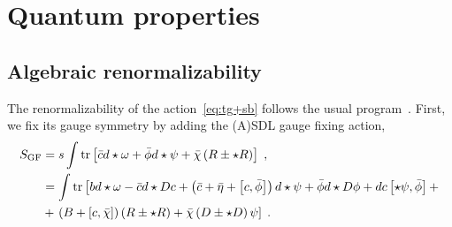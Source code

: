 \documentclass[../main.tex]{subfiles}
\begin{document}
\section{Quantum properties}\label{sec:quantum}

\subsection{Algebraic renormalizability}\label{ssec:renorm;sec:quantum}

The renormalizability of the action~\eqref{eq:tg+sb} follows the usual program~\cite{brandhuber1994a,sadovski2017c}. First, we fix its gauge symmetry by adding the (A)SDL gauge fixing action,
\begin{subequations}%
  \label{eq:tg-gf-action}
  \begin{align}
    S_{\text{GF}} & = s \int \operatorname{tr} \left[ \bar{c} d \star \omega + \bar{\phi} d \star \psi + \bar{\chi} \left( R \pm \star R \right) \right] \;,                                                                                                           \\
                  & = \int \operatorname{tr} \left[ b d \star \omega - \bar{c} d \star Dc + \left( \bar{c} + \bar{\eta} + \left[ c,\bar{\phi} \right] \right) d \star \psi + \bar{\phi} d \star D \phi + d c \left[ \star \psi ,\bar{\phi} \right] + \right. \nonumber \\
                  & + \left. \left( B + \left[ c,\bar{\chi} \right] \right) \left( R \pm \star R \right) + \bar{\chi} \left( D \pm \star D \right) \psi \right] \;.
  \end{align}
\end{subequations}
\end{document}
